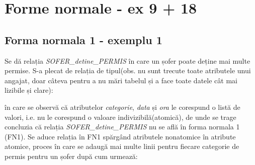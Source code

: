 \documentclass[12pt, a4paper]{article}
\begin{document}
\section{Forme normale - ex 9 + 18}

\subsection*{Forma normala 1 - exemplu 1}
Se dă relația \emph{SOFER\_detine\_PERMIS} în care un șofer poate deține mai multe permise. S-a plecat de relația de tipul(obs. nu sunt trecute toate atributele unui angajat, doar câteva pentru a nu mări tabelul și a face toate datele cât mai lizibile și clare):

\begin{table}[!htbp]
\caption{Relația nu e în FN1}\label{tab1}
\end{table}

în care se observă că atributelor \emph{categorie}, \emph{data} și \emph{ora} le corespund o listă de valori, i.e. nu le corespund o valoare indivizibilă(atomică), de unde se trage concluzia că relația \emph{SOFER\_detine\_PERMIS} nu se află în forma normala 1 (FN1). Se aduce relația în FN1 spărgând atributele nonatomice în atribute atomice, proces în care se adaugă mai multe linii pentru fiecare categorie de permis pentru un șofer după cum urmează:
\end{document}
